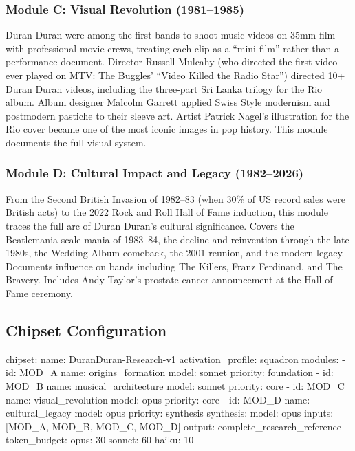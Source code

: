 \documentclass[11pt,letterpaper]{article}
\begin{document}
\subsubsection{Module C: Visual Revolution (1981--1985)}
Duran Duran were among the first bands to shoot music videos on 35mm film with professional movie crews, treating each clip as a ``mini-film'' rather than a performance document. Director Russell Mulcahy (who directed the first video ever played on MTV: The Buggles' ``Video Killed the Radio Star'') directed 10+ Duran Duran videos, including the three-part Sri Lanka trilogy for the Rio album. Album designer Malcolm Garrett applied Swiss Style modernism and postmodern pastiche to their sleeve art. Artist Patrick Nagel's illustration for the Rio cover became one of the most iconic images in pop history. This module documents the full visual system.

\subsubsection{Module D: Cultural Impact and Legacy (1982--2026)}
From the Second British Invasion of 1982--83 (when 30\% of US record sales were British acts) to the 2022 Rock and Roll Hall of Fame induction, this module traces the full arc of Duran Duran's cultural significance. Covers the Beatlemania-scale mania of 1983--84, the decline and reinvention through the late 1980s, the Wedding Album comeback, the 2001 reunion, and the modern legacy. Documents influence on bands including The Killers, Franz Ferdinand, and The Bravery. Includes Andy Taylor's prostate cancer announcement at the Hall of Fame ceremony.

\subsection{Chipset Configuration}

\begin{asciibox}
chipset:
  name: DuranDuran-Research-v1
  activation_profile: squadron
  modules:
    - id: MOD_A
      name: origins_formation
      model: sonnet
      priority: foundation
    - id: MOD_B
      name: musical_architecture
      model: sonnet
      priority: core
    - id: MOD_C
      name: visual_revolution
      model: opus
      priority: core
    - id: MOD_D
      name: cultural_legacy
      model: opus
      priority: synthesis
  synthesis:
    model: opus
    inputs: [MOD_A, MOD_B, MOD_C, MOD_D]
    output: complete_research_reference
  token_budget:
    opus: 30%
    sonnet: 60%
    haiku: 10%
\end{asciibox}
\end{document}
